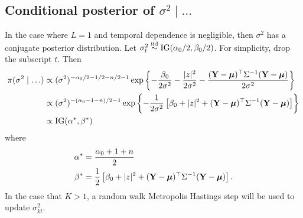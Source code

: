 \subsection*{Conditional posterior of $\sigma^2 \mid \ldots$}\label{sts:sigpost}
In the case where $L = 1$ and temporal dependence is negligible, then $\sigma^2$ has a conjugate posterior distribution.
Let $\sigma_t^2 \stackrel{\mathrm{iid}}{\sim} \mbox{IG}(\alpha_0 / 2, \beta_0 / 2)$. For simplicity, drop the subscript $t$. Then
\begin{align*}
    \pi(\sigma^2 \mid \ldots) & \propto (\sigma^2)^{ -\alpha_0 / 2 - 1 / 2 - n / 2 - 1} \exp \left\{ -\frac{\beta_0}{2\sigma^2} - \frac{ |z|^2 }{2 \sigma^2} - \frac{ (\mathbf{Y} - \mbox{\boldmath $\mu$})^\top \Sigma^{-1} (\mathbf{Y} - \mbox{\boldmath $\mu$}) }{2 \sigma^2} \right\} \\
    & \propto (\sigma^2)^{ -(\alpha_0 - 1 - n) / 2 - 1} \exp \left\{ - \frac{ 1 }{ 2 \sigma^2 } \left[\beta_0 + |z|^2 + (\mathbf{Y} - \mbox{\boldmath $\mu$})^\top \Sigma^{-1} (\mathbf{Y} - \mbox{\boldmath $\mu$}) \right] \right\} \\
    & \propto \mbox{IG} (\alpha^*, \beta^*)
\end{align*}
where
\begin{align*}
    \alpha^* &= \frac{\alpha_0 + 1 + n}{2} \\
    \beta^* &= \frac{1}{2} \left[ \beta_0 + |z|^2 + (\mathbf{Y} - \mbox{\boldmath $\mu$})^\top \Sigma^{-1} (\mathbf{Y} - \mbox{\boldmath $\mu$}) \right].
\end{align*}
In the case that $K > 1$, a random walk Metropolis Hastings step will be used to update $\sigma^2_{kt}$.

